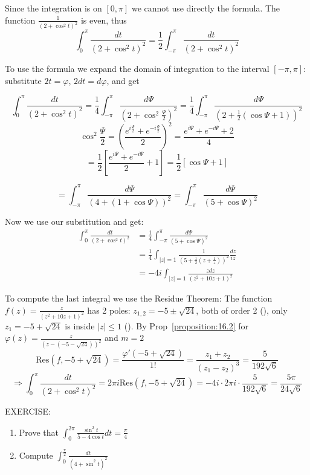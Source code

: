     \begin{soln}
         Since the integration is on $[0, \pi]$ we cannot use directly the formula. The function $\frac{1}{(2 + \cos^2 t)^2}$ is even, thus
        \[
        \int_0^{\pi} \frac{dt}{(2 + \cos^2 t)^2} = \frac{1}{2} \int_{-\pi}^{\pi} \frac{dt}{(2 + \cos^2 t)^2}
        \]

To use the formula we expand the domain of integration to the interval $[-\pi, \pi]$: substitute $2t = \varphi$, $2dt = d\varphi$, and get


\[
\int_0^{\pi} \frac{dt}{(2 + \cos^2 t)^2} = \frac{1}{4} \int_{-\pi}^{\pi} \frac{d\Psi}{(2 + \cos^2 \frac{\Psi}{2})^2} = \frac{1}{4} \int_{-\pi}^{\pi} \frac{d\Psi}{(2 + \frac{1}{2} (\cos \Psi + 1))^2}
\]
\[
\cos^2 \frac{\Psi}{2} = \left( \frac{e^{i \frac{\Psi}{2}} + e^{-i \frac{\Psi}{2}}}{2} \right)^2 = \frac{e^{i \Psi} + e^{-i \Psi} + 2}{4}
\]
\[
= \frac{1}{2} \left[ \frac{e^{i \Psi} + e^{-i \Psi}}{2} + 1 \right] = \frac{1}{2} [\cos \Psi + 1]
\]

\[
= \int_{-\pi}^{\pi} \frac{d\Psi}{(4 + (1 + \cos \Psi))^2} = \int_{-\pi}^{\pi} \frac{d\Psi}{(5 + \cos \Psi)^2}
\]

Now we use our substitution and get:
\begin{align*}
\int_0^{\pi} \frac{dt}{(2 + \cos^2 t)^2} &= \frac{1}{4} \int_{-\pi}^{\pi} \frac{d\Psi}{(5 + \cos \Psi)^2} \\
&= \frac{1}{4} \int_{|z|=1} \frac{1}{(5 + \frac{1}{2} (z + \frac{1}{z}))^2} \frac{dz}{iz} \\
&= -4i \int_{|z|=1} \frac{z dz}{(z^2 + 10z + 1)^2}
\end{align*}

To compute the last integral we use the Residue Theorem:
The function $f(z) = \frac{z}{(z^2 + 10z + 1)^2}$ has 2 poles: $z_{1,2} = -5 \pm \sqrt{24}$, 
both of order 2 (\verifythis), only $z_1 = -5 + \sqrt{24}$ is inside $|z| \le 1$ (\verifythis). 
By Prop~\ref{proposition:16.2} for $\varphi(z) = \frac{z}{(z - (-5 - \sqrt{24}))^2}$ and $m = 2$
\[
\text{Res} \left( f, -5 + \sqrt{24} \right) = \frac{\varphi'(-5 + \sqrt{24})}{1!} = \frac{z_1 + z_2}{(z_1 - z_2)^3} = \frac{5}{192 \sqrt{6}}
\]
\[
    \Rightarrow \int_0^{\pi} \frac{dt}{(2 + \cos^2 t)^2} = 2\pi i \text{Res} \left( f, -5 + \sqrt{24} \right) = -4i \cdot 2\pi i \cdot \frac{5}{192 \sqrt{6}} = \frac{5\pi}{24 \sqrt{6}}
    \]
    
\end{soln}
\begin{exercise}
    EXERCISE:
    \begin{enumerate}
        \item Prove that $\int_0^{2\pi} \frac{\sin^2 t}{5 - 4 \cos t} dt = \frac{\pi}{4}$
        \item Compute $\int_0^{\frac{\pi}{2}} \frac{dt}{(4 + \sin^2 t)^2}$
    \end{enumerate}
\end{exercise}

